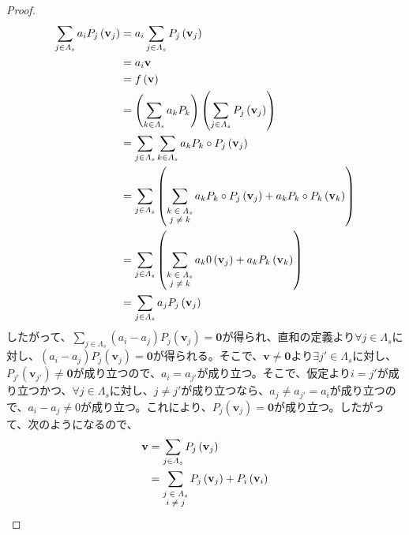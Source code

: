 \documentclass[dvipdfmx]{jsarticle}
\begin{document}
\begin{proof}
\begin{align*}
\sum_{j \in \varLambda_{s}} {a_{i}P_{j}\left( \mathbf{v}_{j} \right)} &= a_{i}\sum_{j \in \varLambda_{s}} {P_{j}\left( \mathbf{v}_{j} \right)}\\
&= a_{i}\mathbf{v}\\
&= f\left( \mathbf{v} \right)\\
&= \left( \sum_{k \in \varLambda_{s}} {a_{k}P_{k}} \right)\left( \sum_{j \in \varLambda_{s}} {P_{j}\left( \mathbf{v}_{j} \right)} \right)\\
&= \sum_{j \in \varLambda_{s}} {\sum_{k \in \varLambda_{s}} {a_{k}P_{k} \circ P_{j}\left( \mathbf{v}_{j} \right)}}\\
&= \sum_{j \in \varLambda_{s}} \left( \sum_{\scriptsize \begin{matrix} k \in \varLambda_{s} \\j \neq k \\\end{matrix}} {a_{k}P_{k} \circ P_{j}\left( \mathbf{v}_{j} \right)} + a_{k}P_{k} \circ P_{k}\left( \mathbf{v}_{k} \right) \right)\\
&= \sum_{j \in \varLambda_{s}} \left( \sum_{\scriptsize \begin{matrix} k \in \varLambda_{s} \\j \neq k \\\end{matrix}} {a_{k}0\left( \mathbf{v}_{j} \right)} + a_{k}P_{k}\left( \mathbf{v}_{k} \right) \right)\\
&= \sum_{j \in \varLambda_{s}} {a_{j}P_{j}}\left( \mathbf{v}_{j} \right)
\end{align*}
したがって、$\sum_{j \in \varLambda_{s}} {\left( a_{i} - a_{j} \right)P_{j}\left( \mathbf{v}_{j} \right)} = \mathbf{0}$が得られ、直和の定義より$\forall j \in \varLambda_{s}$に対し、$\left( a_{i} - a_{j} \right)P_{j}\left( \mathbf{v}_{j} \right) = \mathbf{0}$が得られる。そこで、$\mathbf{v} \neq \mathbf{0}$より$\exists j' \in \varLambda_{s}$に対し、$P_{j'}\left( \mathbf{v}_{j'} \right) \neq \mathbf{0}$が成り立つので、$a_{i} = a_{j'}$が成り立つ。そこで、仮定より$i = j'$が成り立つかつ、$\forall j \in \varLambda_{s}$に対し、$j \neq j'$が成り立つなら、$a_{j} \neq a_{j'} = a_{i}$が成り立つので、$a_{i} - a_{j} \neq 0$が成り立つ。これにより、$P_{j}\left( \mathbf{v}_{j} \right) = \mathbf{0}$が成り立つ。したがって、次のようになるので、
\begin{align*}
\mathbf{v} &= \sum_{j \in \varLambda_{s}} {P_{j}\left( \mathbf{v}_{j} \right)} \\
&= \sum_{\scriptsize \begin{matrix} j \in \varLambda_{s} \\i \neq j \\\end{matrix}} {P_{j}\left( \mathbf{v}_{j} \right)} + P_{i}\left( \mathbf{v}_{i} \right) \\

\end{align*}
\end{proof}
\end{document}
